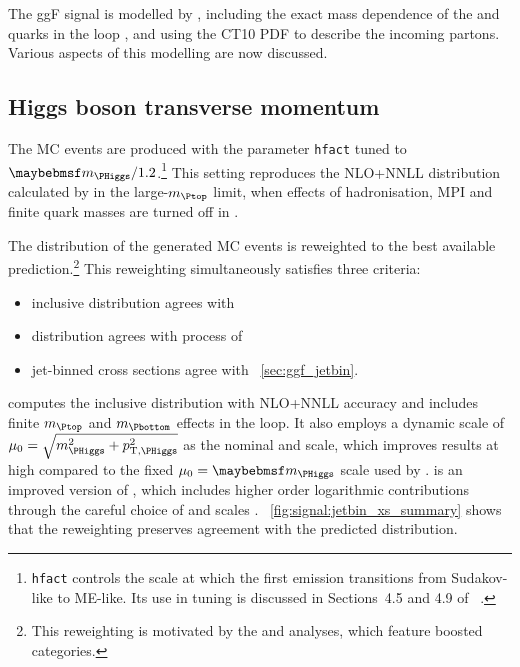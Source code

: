 
The ggF signal is modelled by , including the exact mass 
dependence of the \Ptop and \Pbottom quarks in the loop \cite{Powheg-ggF-quarkmasses}, and 
using the CT10 PDF \cite{CTEQ} to describe the incoming partons. Various aspects of this 
modelling are now discussed.



\subsection{Higgs boson transverse momentum}
\label{sec:ggF:pt}

The MC events are produced with the \powhegbox parameter \verb|hfact| tuned to 
$\mH/1.2$.\footnote{
	\texttt{hfact} controls the scale at which the first emission transitions from 
	Sudakov-like to ME-like. Its use in tuning \ptH is discussed in Sections~4.5 and 4.9 of 
	\Reference~\cite{YR2}.
}
This setting reproduces the NLO+NNLL \ptH distribution calculated by \hqt \cite{HqT2} in 
the large-$m_{\Ptop}$ limit, when effects of hadronisation, MPI and finite quark masses are 
turned off in .

The \ptH distribution of the generated MC events is reweighted to the best available 
prediction.\footnote{
	This \ptH reweighting is motivated by the \HepProcess{\PHiggs \HepTo \Pphoton\Pphoton} 
	and \HepProcess{\PHiggs \HepTo \Ptau\Ptau} analyses, which feature boosted categories.
}
This reweighting simultaneously satisfies three criteria:
\begin{itemize}[noitemsep,nolistsep]
	\item inclusive \ptH distribution agrees with \hres \cite{HRes}
	\item \twojet \ptH distribution agrees with  process of  \cite{Minlo:Hjj}
	\item jet-binned cross sections agree with \Section~\ref{sec:ggf_jetbin}.
\end{itemize}
\hres computes the inclusive \ptH distribution with NLO+NNLL accuracy and includes finite 
$m_{\Ptop}$ and $m_{\Pbottom}$ effects in the loop. It also employs a dynamic scale of 
$\mu_0 = \sqrt{m_{\PHiggs}^2 + p_{\text{T,\PHiggs}}^2}$ as the nominal \mur and \muf scale, 
which improves results at high \ptH compared to the fixed $\mu_0 = \mH$ scale used by \hqt.
\minlo is an improved version of \powhegbox, which includes higher order logarithmic 
contributions through the careful choice of \mur and \muf scales \cite{Minlo:Hjj}. 
\Figure~\ref{fig:signal:jetbin_xs_summary} shows that the reweighting preserves agreement 
with the predicted \njets distribution.



